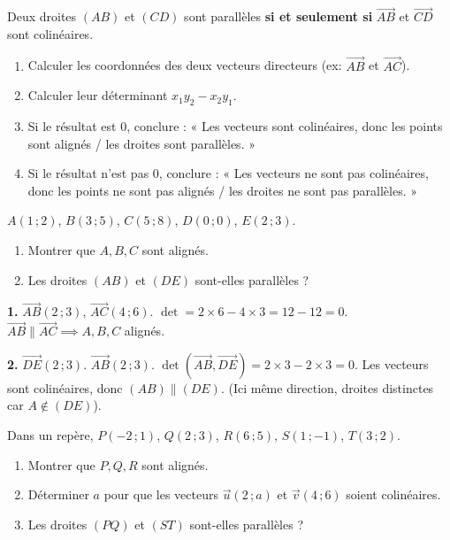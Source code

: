 \documentclass[11pt]{article}
\begin{document}
\begin{propriete}
Deux droites $(AB)$ et $(CD)$ sont parallèles \textbf{si et seulement si} $\overrightarrow{AB}$ et $\overrightarrow{CD}$ sont colinéaires.
\end{propriete}

\begin{methode}
\begin{enumerate}
\item Calculer les coordonnées des deux vecteurs directeurs (ex: $\overrightarrow{AB}$ et $\overrightarrow{AC}$).
\item Calculer leur déterminant $x_1y_2 - x_2y_1$.
\item Si le résultat est $0$, conclure : « Les vecteurs sont colinéaires, donc les points sont alignés / les droites sont parallèles. »
\item Si le résultat n'est pas $0$, conclure : « Les vecteurs ne sont pas colinéaires, donc les points ne sont pas alignés / les droites ne sont pas parallèles. »
\end{enumerate}
\end{methode}

\begin{exoresolu}
$A(1\,;2)$, $B(3\,;5)$, $C(5\,;8)$, $D(0\,;0)$, $E(2\,;3)$.
\begin{enumerate}
\item Montrer que $A, B, C$ sont alignés.
\item Les droites $(AB)$ et $(DE)$ sont-elles parallèles ?
\end{enumerate}
\tcblower
\textbf{1.} $\overrightarrow{AB}(2\,;3)$, $\overrightarrow{AC}(4\,;6)$.
$\det = 2\times 6 - 4\times 3 = 12 - 12 = 0$.
$\overrightarrow{AB} \parallel \overrightarrow{AC} \implies A, B, C$ alignés.

\textbf{2.} $\overrightarrow{DE}(2\,;3)$. $\overrightarrow{AB}(2\,;3)$.
$\det(\overrightarrow{AB},\overrightarrow{DE}) = 2\times 3 - 2\times 3 = 0$.
Les vecteurs sont colinéaires, donc $(AB) \parallel (DE)$. (Ici même direction, droites distinctes car $A\notin (DE)$).
\end{exoresolu}

\begin{exercice}
Dans un repère, $P(-2\,;1)$, $Q(2\,;3)$, $R(6\,;5)$, $S(1\,;-1)$, $T(3\,;2)$.
\begin{enumerate}
\item Montrer que $P, Q, R$ sont alignés.
\item Déterminer $a$ pour que les vecteurs $\vec{u}(2\,;a)$ et $\vec{v}(4\,;6)$ soient colinéaires.
\item Les droites $(PQ)$ et $(ST)$ sont-elles parallèles ?
\end{enumerate}
\end{exercice}
\end{document}
